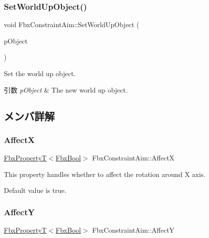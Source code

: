 \subsubsection{\texorpdfstring{Set\+World\+Up\+Object()}{SetWorldUpObject()}}
{\footnotesize\ttfamily void Fbx\+Constraint\+Aim\+::\+Set\+World\+Up\+Object (\begin{DoxyParamCaption}\item[{\hyperlink{class_fbx_object}{Fbx\+Object} $\ast$}]{p\+Object }\end{DoxyParamCaption})}

Set the world up object. 
\begin{DoxyParams}{引数}
{\em p\+Object} & The new world up object. \\
\hline
\end{DoxyParams}


\subsection{メンバ詳解}
\mbox{\label{class_fbx_constraint_aim_a93257a107d3b178be6af8a221cf1b819}} 
\subsubsection{\texorpdfstring{AffectX}{AffectX}}
{\footnotesize\ttfamily \hyperlink{class_fbx_property_t}{Fbx\+PropertyT}$<$\hyperlink{fbxtypes_8h_a92e0562b2fe33e76a242f498b362262e}{Fbx\+Bool}$>$ Fbx\+Constraint\+Aim\+::\+AffectX}

This property handles whether to affect the rotation around X axis.

Default value is true. \mbox{\label{class_fbx_constraint_aim_af3de7ec97229a3b7e63d23a3d9daaa98}} 
\subsubsection{\texorpdfstring{AffectY}{AffectY}}
{\footnotesize\ttfamily \hyperlink{class_fbx_property_t}{Fbx\+PropertyT}$<$\hyperlink{fbxtypes_8h_a92e0562b2fe33e76a242f498b362262e}{Fbx\+Bool}$>$ Fbx\+Constraint\+Aim\+::\+AffectY}


